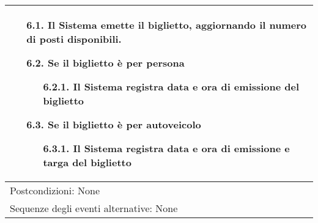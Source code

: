 \documentclass{article}
\begin{document}
\begin{table}[h!]
\begin{tabular}{|p{}|}
\begin{itemize}[leftmargin=1.2em]
			\begin{itemize}
			\item[6.1.] Il Sistema emette il biglietto, 
	aggiornando il numero di posti 
	disponibili.
			\item[6.2.] Se il biglietto è per persona
				\vspace{-0.1\baselineskip}
				\begin{itemize}[leftmargin=2.8em]
					\item[6.2.1.] Il Sistema registra data e ora di emissione del biglietto
				\end{itemize}
				\item[6.3.] Se il biglietto è per autoveicolo
				\vspace{-0.1\baselineskip}
				\begin{itemize}[leftmargin=2.8em]
					\item[6.3.1.] Il Sistema registra data e ora di emissione e targa del biglietto
				\end{itemize}
			\end{itemize}
			\vspace{-0.4\baselineskip}
		\end{itemize}
		\vspace{-1.5\baselineskip}
		\\
		\hline
		Postcondizioni: None\\
		\hline
		Sequenze degli eventi alternative: None\\
		\hline
	\end{tabular}
\end{table}
\end{document}
